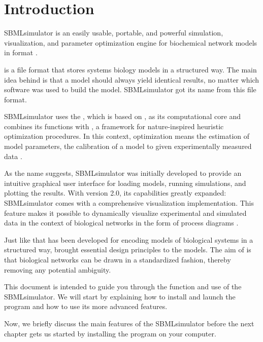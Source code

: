 
\chapter{Introduction}

SBMLsimulator \citep{Doerr2014a} is an easily usable, portable, and powerful simulation, visualization, and parameter optimization engine for biochemical network models in \SBML format \citep{M.Hucka03012003}.

\SBML is a file format that stores systems biology models in a structured way.
The main idea behind \SBML is that a model should always yield identical results, no matter which software was used to build the model.
SBMLsimulator got its name from this file format.

SBMLsimulator uses the \SBSCL \citep{Keller2013}, which is based on \JSBML \citep{Draeger2011, Rodriguez2015}, as its computational core and combines its functions with \EvA \citep{Kron10EvA2}, a \Java framework for nature-inspired heuristic optimization procedures.
In this context, optimization means the estimation of model parameters, \ie the calibration of a model to given experimentally measured data \citep{Draeger2009a}.

As the name suggests, SBMLsimulator was initially developed to provide an intuitive graphical user interface for loading \SBML models, running simulations, and plotting the results.
With version 2.0, its capabilities greatly expanded: SBMLsimulator comes with a comprehensive visualization implementation. 
This feature makes it possible to dynamically visualize experimental and simulated data in the context of biological networks in the form of \SBGN process diagrams \citep{Rougny2019}.

Just like \SBML that has been developed for encoding models of biological systems in a structured way, \SBGN brought essential design principles to the models.
The aim of \SBGN is that biological networks can be drawn in a standardized fashion, thereby removing any potential ambiguity.

This document is intended to guide you through the function and use of the SBMLsimulator.
We will start by explaining how to install and launch the program and how to use its more advanced features.

Now, we briefly discuss the main features of the SBMLsimulator before the next chapter gets us started by installing the program on your computer.


